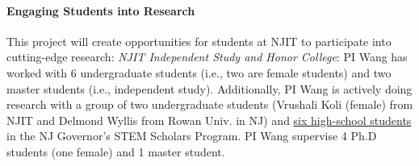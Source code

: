 \paragraph{Engaging Students into Research}

This project will create opportunities for students at NJIT to
participate into cutting-edge research: {\em NJIT Independent Study
and Honor College}: PI Wang has worked with 6 undergraduate students
(i.e., two are female students) and two master students (i.e.,
independent study). Additionally, PI Wang is actively doing research with a
group of two undergraduate students (Vrushali Koli (female) from NJIT
and Delmond Wyllis from Rowan Univ. in NJ) and \underline{six
high-school students} in the NJ Governor's STEM Scholars Program.  PI
Wang supervise 4 Ph.D students (one female) and 1
master student.
%

